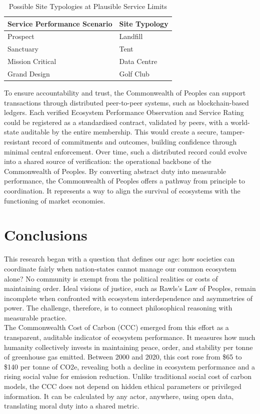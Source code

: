 \documentclass[12pt, oneside]{article}   	%
\begin{document}
\begin{table}[H]
\caption{Possible Site Typologies at Plausible Service Limits}
\begin{center}
\begin{tabular}{| l | l |}
\hline
Service Performance Scenario&Site Typology\\
\hline
Prospect&Landfill\\
Sanctuary&Tent\\
Mission Critical&Data Centre\\
Grand Design&Golf Club\\
\hline
\end{tabular}
\end{center}
\label{Service limits table}
\end{table}

To ensure accountability and trust, the Commonwealth of Peoples can support transactions through distributed peer-to-peer systems, such as blockchain-based ledgers.
Each verified Ecosystem Performance Observation and Service Rating could be registered as a standardised contract, validated by peers, with a world-state auditable by the entire membership.
This would create a secure, tamper-resistant record of commitments and outcomes, building confidence through minimal central enforcement.
Over time, such a distributed record could evolve into a shared source of verification: the operational backbone of the Commonwealth of Peoples.
By converting abstract duty into measurable performance, the Commonwealth of Peoples offers a pathway from principle to coordination.
It represents a way to align the survival of ecosystems with the functioning of market economies.\\

\section{Conclusions}

This research began with a question that defines our age: how societies can coordinate fairly when nation-states cannot manage our common ecosystem alone?
No community is exempt from the political realities or costs of maintaining order.
Ideal visions of justice, such as Rawls’s Law of Peoples, remain incomplete when confronted with ecosystem interdependence and asymmetries of power.
The challenge, therefore, is to connect philosophical reasoning with measurable practice.\\

The Commonwealth Cost of Carbon (CCC) emerged from this effort as a transparent, auditable indicator of ecosystem performance.
It measures how much humanity collectively invests in maintaining peace, order, and stability per tonne of greenhouse gas emitted.
Between 2000 and 2020, this cost rose from \$65 to \$140 per tonne of CO2e, revealing both a decline in ecosystem performance and a rising social value for emission reduction.
Unlike traditional social cost of carbon models, the CCC does not depend on hidden ethical parameters or privileged information.
It can be calculated by any actor, anywhere, using open data, translating moral duty into a shared metric.\\
\end{document}
